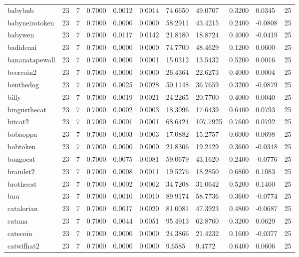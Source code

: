 \begin{table}[htbp]
\begin{tabular}{lllllllllll}
babybnb & 23 & 7 & 0.7000 & 0.0012 & 0.0014 & 74.6650 & 49.0707 & 0.3200 & 0.0345 & 25 \\
babyneirotoken & 23 & 7 & 0.7000 & 0.0000 & 0.0000 & 58.2911 & 43.4215 & 0.2400 & -0.0808 & 25 \\
babywen & 23 & 7 & 0.7000 & 0.0117 & 0.0142 & 21.8180 & 18.8724 & 0.4000 & -0.0419 & 25 \\
badideaai & 23 & 7 & 0.7000 & 0.0000 & 0.0000 & 74.7700 & 48.4629 & 0.1200 & 0.0600 & 25 \\
bananatapewall & 23 & 7 & 0.7000 & 0.0000 & 0.0001 & 15.0312 & 13.5432 & 0.5200 & 0.0016 & 25 \\
beercoin2 & 23 & 7 & 0.7000 & 0.0000 & 0.0000 & 26.4364 & 22.6273 & 0.4000 & 0.0004 & 25 \\
benthedog & 23 & 7 & 0.7000 & 0.0025 & 0.0028 & 50.1148 & 36.7659 & 0.3200 & -0.0879 & 25 \\
billy & 23 & 7 & 0.7000 & 0.0019 & 0.0021 & 24.2265 & 20.7700 & 0.4000 & 0.0040 & 25 \\
bingusthecat & 23 & 7 & 0.7000 & 0.0002 & 0.0003 & 18.3096 & 17.6439 & 0.6400 & 0.0793 & 25 \\
bitcat2 & 23 & 7 & 0.7000 & 0.0001 & 0.0001 & 68.6424 & 107.7925 & 0.7600 & 0.0792 & 25 \\
bobaoppa & 23 & 7 & 0.7000 & 0.0003 & 0.0003 & 17.0882 & 15.2757 & 0.6000 & 0.0698 & 25 \\
bobtoken & 23 & 7 & 0.7000 & 0.0000 & 0.0000 & 21.8306 & 19.2129 & 0.3600 & -0.0348 & 25 \\
bongocat & 23 & 7 & 0.7000 & 0.0075 & 0.0081 & 59.0679 & 43.1620 & 0.2400 & -0.0776 & 25 \\
brainlet2 & 23 & 7 & 0.7000 & 0.0008 & 0.0011 & 19.5276 & 18.2850 & 0.6800 & 0.1083 & 25 \\
brothecat & 23 & 7 & 0.7000 & 0.0002 & 0.0002 & 34.7208 & 31.0642 & 0.5200 & 0.1460 & 25 \\
buu & 23 & 7 & 0.7000 & 0.0010 & 0.0010 & 89.9174 & 58.7736 & 0.3600 & -0.0774 & 25 \\
catalorian & 23 & 7 & 0.7000 & 0.0017 & 0.0020 & 81.0081 & 47.3923 & 0.4800 & -0.0687 & 25 \\
catana & 23 & 7 & 0.7000 & 0.0044 & 0.0051 & 95.4913 & 62.8760 & 0.3200 & 0.0629 & 25 \\
catecoin & 23 & 7 & 0.7000 & 0.0000 & 0.0000 & 24.3866 & 21.4232 & 0.1600 & -0.0377 & 25 \\
catwifhat2 & 23 & 7 & 0.7000 & 0.0000 & 0.0000 & 9.6585 & 9.4772 & 0.6400 & 0.0606 & 25 \\

\end{tabular}
\end{table}
